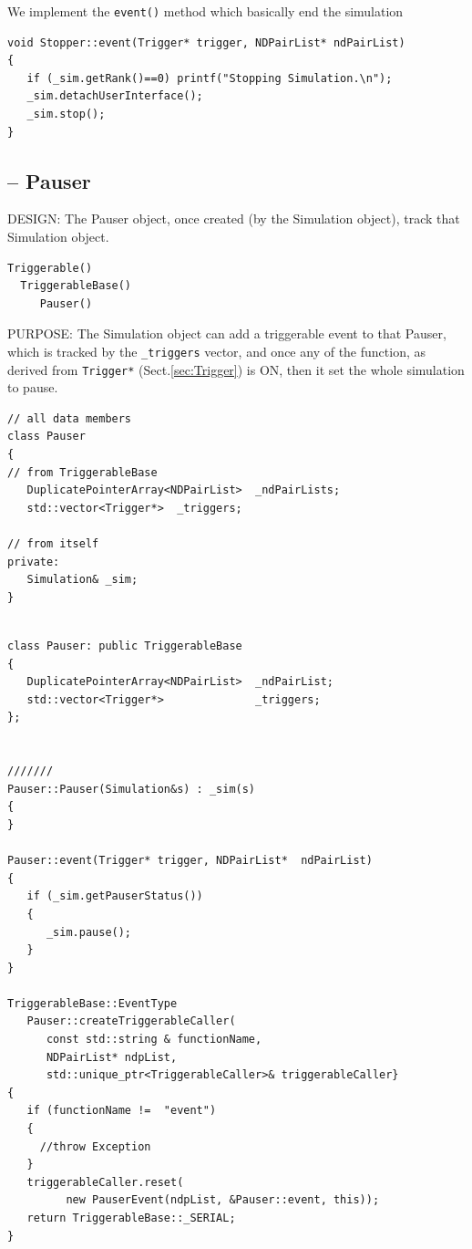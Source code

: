 We implement the \verb!event()! method which basically end the simulation
\begin{verbatim}
void Stopper::event(Trigger* trigger, NDPairList* ndPairList)
{
   if (_sim.getRank()==0) printf("Stopping Simulation.\n");
   _sim.detachUserInterface();
   _sim.stop();
}
\end{verbatim}

\subsection{-- Pauser}
\label{sec:Pauser}

DESIGN: The Pauser object, once created (by the Simulation object), track that
Simulation object.
\begin{verbatim}
Triggerable()
  TriggerableBase()
     Pauser()
\end{verbatim}

PURPOSE: The Simulation object can add a triggerable event to that Pauser, which
is tracked by the \verb!_triggers! vector, and once any of the function, as
derived from \verb!Trigger*! (Sect.\ref{sec:Trigger}) is ON, then it set the
whole simulation to pause.

\begin{verbatim}
// all data members
class Pauser
{
// from TriggerableBase
   DuplicatePointerArray<NDPairList>  _ndPairLists;
   std::vector<Trigger*>  _triggers;

// from itself
private:
   Simulation& _sim;
}
\end{verbatim}

\begin{lstlisting}

class Pauser: public TriggerableBase
{
   DuplicatePointerArray<NDPairList>  _ndPairList;
   std::vector<Trigger*>              _triggers;
};


///////
Pauser::Pauser(Simulation&s) : _sim(s)
{
}

Pauser::event(Trigger* trigger, NDPairList*  ndPairList)
{
   if (_sim.getPauserStatus())
   {
      _sim.pause();
   }
}

TriggerableBase::EventType
   Pauser::createTriggerableCaller(
      const std::string & functionName,
      NDPairList* ndpList,
      std::unique_ptr<TriggerableCaller>& triggerableCaller}
{
   if (functionName !=  "event")
   { 
     //throw Exception
   }
   triggerableCaller.reset(
         new PauserEvent(ndpList, &Pauser::event, this));
   return TriggerableBase::_SERIAL;
}
\end{lstlisting}


